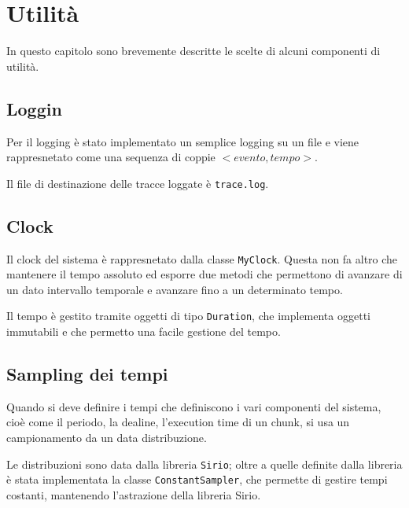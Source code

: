 \section{Utilità}
In questo capitolo sono brevemente descritte le scelte di alcuni componenti di utilità.

\subsection{Loggin}
Per il logging è stato implementato un semplice logging su un file e viene rappresnetato come una sequenza di coppie $<evento,tempo>$.

Il file di destinazione delle tracce loggate è \texttt{trace.log}.

\subsection{Clock}
Il clock del sistema è rappresnetato dalla classe \texttt{MyClock}. Questa non fa altro che mantenere il tempo assoluto ed esporre due metodi che permettono di avanzare di un dato intervallo temporale e avanzare fino a un determinato tempo.

Il tempo è gestito tramite oggetti di tipo \texttt{Duration}, che implementa oggetti immutabili e che permetto una facile gestione del tempo.

\subsection{Sampling dei tempi}
Quando si deve definire i tempi che definiscono i vari componenti del sistema, cioè come il periodo, la dealine, l'execution time di un chunk, si usa un campionamento da un data distribuzione.

Le distribuzioni sono data dalla libreria \texttt{Sirio}; oltre a quelle definite dalla libreria è stata implementata la classe \texttt{ConstantSampler}, che permette di gestire tempi costanti, mantenendo l'astrazione della libreria Sirio.